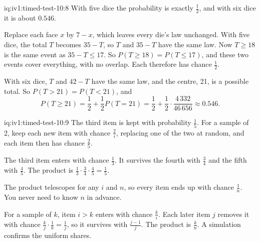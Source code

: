\begin{solution}{iq:iv1:timed-test-10:8}
With five dice the probability is exactly $\frac12$, and with six dice it is about $0.546$.

Replace each face $x$ by $7 - x$, which leaves every die's law unchanged. With five dice, the total $T$ becomes $35 - T$, so $T$ and $35 - T$ have the same law. Now $T \ge 18$ is the same event as $35 - T \le 17$. So $P(T \ge 18) = P(T \le 17)$, and these two events cover everything, with no overlap. Each therefore has chance $\frac12$.

With six dice, $T$ and $42 - T$ have the same law, and the centre, 21, is a possible total. So $P(T > 21) = P(T < 21)$, and
\[
P(T \ge 21) = \frac12 + \frac12P(T = 21) = \frac12 + \frac12 \cdot \frac{4\,332}{46\,656} \approx 0.546.
\]

\end{solution}

\begin{solution}{iq:iv1:timed-test-10:9}
The third item is kept with probability $\frac15$. For a sample of 2, keep each new item with chance $\frac2i$, replacing one of the two at random, and each item then has chance $\frac25$.

The third item enters with chance $\frac13$. It survives the fourth with $\frac34$ and the fifth with $\frac45$. The product is $\frac13 \cdot \frac34 \cdot \frac45 = \frac15$.

The product telescopes for any $i$ and $n$, so every item ends up with chance $\frac1n$. You never need to know $n$ in advance.

For a sample of $k$, item $i > k$ enters with chance $\frac{k}{i}$. Each later item $j$ removes it with chance $\frac{k}{j} \cdot \frac1k = \frac1j$, so it survives with $\frac{j - 1}{j}$. The product is $\frac{k}{n}$. A simulation confirms the uniform shares.

\end{solution}

